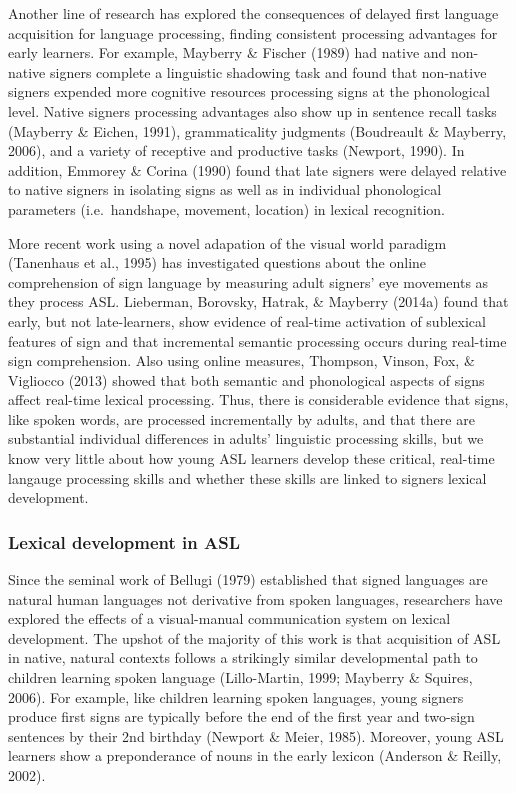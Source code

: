 \documentclass[12pt,]{article}
\begin{document}
Another line of research has explored the consequences of delayed first
language acquisition for language processing, finding consistent
processing advantages for early learners. For example, Mayberry \&
Fischer (1989) had native and non-native signers complete a linguistic
shadowing task and found that non-native signers expended more cognitive
resources processing signs at the phonological level. Native signers
processing advantages also show up in sentence recall tasks (Mayberry \&
Eichen, 1991), grammaticality judgments (Boudreault \& Mayberry, 2006),
and a variety of receptive and productive tasks (Newport, 1990). In
addition, Emmorey \& Corina (1990) found that late signers were delayed
relative to native signers in isolating signs as well as in individual
phonological parameters (i.e.~handshape, movement, location) in lexical
recognition.

More recent work using a novel adapation of the visual world paradigm
(Tanenhaus et al., 1995) has investigated questions about the online
comprehension of sign language by measuring adult signers' eye movements
as they process ASL. Lieberman, Borovsky, Hatrak, \& Mayberry (2014a)
found that early, but not late-learners, show evidence of real-time
activation of sublexical features of sign and that incremental semantic
processing occurs during real-time sign comprehension. Also using online
measures, Thompson, Vinson, Fox, \& Vigliocco (2013) showed that both
semantic and phonological aspects of signs affect real-time lexical
processing. Thus, there is considerable evidence that signs, like spoken
words, are processed incrementally by adults, and that there are
substantial individual differences in adults' linguistic processing
skills, but we know very little about how young ASL learners develop
these critical, real-time langauge processing skills and whether these
skills are linked to signers lexical development.

\subsubsection{Lexical development in
ASL}\label{lexical-development-in-asl}

Since the seminal work of Bellugi (1979) established that signed
languages are natural human languages not derivative from spoken
languages, researchers have explored the effects of a visual-manual
communication system on lexical development. The upshot of the majority
of this work is that acquisition of ASL in native, natural contexts
follows a strikingly similar developmental path to children learning
spoken language (Lillo-Martin, 1999; Mayberry \& Squires, 2006). For
example, like children learning spoken languages, young signers produce
first signs are typically before the end of the first year and two-sign
sentences by their 2nd birthday (Newport \& Meier, 1985). Moreover,
young ASL learners show a preponderance of nouns in the early lexicon
(Anderson \& Reilly, 2002).
\end{document}
